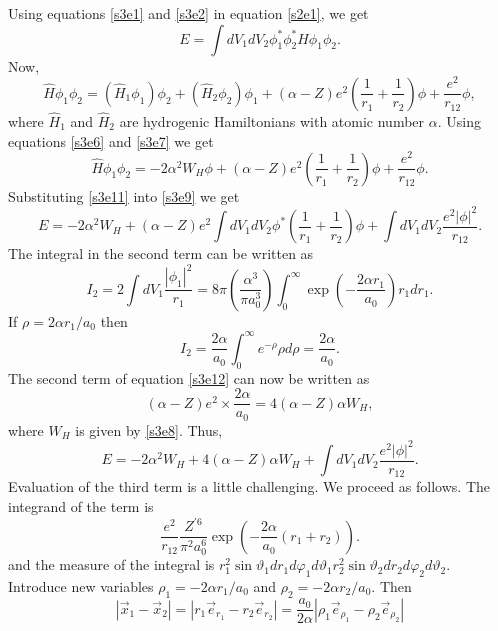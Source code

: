\documentclass{article}
\numberwithin{equation}{section}
\begin{document}
Using equations \eqref{s3e1} and \eqref{s3e2} in equation \eqref{s2e1}, 
we get
\begin{equation}\label{s3e9}
E = \int dV_1 dV_2 \phi_1^\ast\phi_2^\ast\hat{H}\phi_1\phi_2.
\end{equation}
Now, 
\begin{equation}\label{s3e10}
\hat{H}\phi_1\phi_2 = (\hat{H}_1\phi_1)\phi_2 + (\hat{H}_2\phi_2)\phi_1 + 
(\alpha - Z)e^2\left(\frac{1}{r_1} + \frac{1}{r_2}\right)\phi + 
\frac{e^2}{r_{12}}\phi,
\end{equation}
where $\hat{H}_1$ and $\hat{H}_2$ are hydrogenic Hamiltonians with atomic 
number $\alpha$. Using equations \eqref{s3e6} and \eqref{s3e7} we get
\begin{equation}\label{s3e11}
\hat{H}\phi_1\phi_2 = -2\alpha^2W_H\phi + (\alpha - Z)e^2\left(
\frac{1}{r_1} + \frac{1}{r_2}\right)\phi + \frac{e^2}{r_{12}}\phi.
\end{equation}
Substituting \eqref{s3e11} into \eqref{s3e9} we get
\begin{equation}\label{s3e12}
E = -2\alpha^2W_H + (\alpha - Z)e^2\int dV_1dV_2\phi^\ast\left(
\frac{1}{r_1} + \frac{1}{r_2}\right)\phi + \int dV_1dV_2
\frac{e^2|\phi|^2}{r_{12}}.
\end{equation}
The integral in the second term can be written as
\[
I_2 = 2\int dV_1\frac{|\phi_1|^2}{r_1} = 8\pi\left(\frac{\alpha^3}
{\pi a_0^3}\right)\int_0^\infty\exp\left(-\frac{2\alpha r_1}{a_0}\right)
r_1 dr_1.
\]
If $\rho = 2\alpha r_1/a_0$ then
\[
I_2 = \frac{2\alpha}{a_0}\int_0^\infty e^{-\rho}\rho d\rho = 
\frac{2\alpha}{a_0}.
\]
The second term of equation \eqref{s3e12} can now be written as
\[
(\alpha - Z)e^2 \times \frac{2\alpha}{a_0} = 4(\alpha - Z)\alpha W_H,
\]
where $W_H$ is given by \eqref{s3e8}. Thus,
\begin{equation}\label{s3e13}
E = -2\alpha^2{W_H} + 4(\alpha - Z)\alpha W_H +  \int dV_1dV_2
\frac{e^2|\phi|^2}{r_{12}}.
\end{equation}
Evaluation of the third term is a little challenging. We proceed as 
follows.  The integrand of the term is
\[
\frac{e^2}{r_{12}}\frac{Z^{\prime 6}}{\pi^2 a_0^6}\exp\left(
-\frac{2\alpha}{a_0}(r_1 + r_2)\right).
\]
and the measure of the integral is $r_1^2\sin\vartheta_1dr_1d\varphi_1 
d\vartheta_1 r_2^2\sin\vartheta_2dr_2d\varphi_2 d\vartheta_2$. Introduce 
new variables $\rho_1 = -2\alpha r_1/a_0$ and $\rho_2 = -2\alpha r_2/a_0$. 
Then
\[
|\vec{x}_1 - \vec{x}_2| = |r_1 \vec{e}_{r_1} - r_2 \vec{e}_{r_2}| = 
\frac{a_0}{2\alpha}|\rho_1\vec{e}_{\rho_1} - \rho_2\vec{e}_{\rho_2}|
\]
\end{document}
